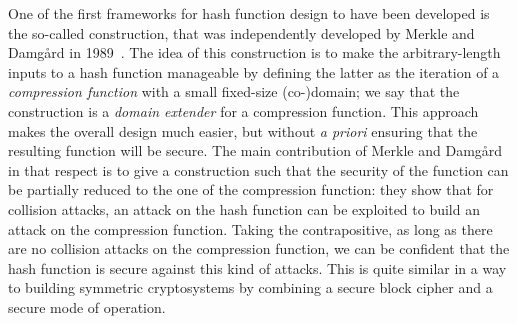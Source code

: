 One of the first frameworks for hash function design to have been developed is the so-called \merkdam construction, that was independently developed by
Merkle and Damg\aa rd in 1989~\cite{DBLP:conf/crypto/Merkle89a,DBLP:conf/crypto/Damgard89a}. The idea of this construction is to make the arbitrary-length
inputs to a hash function manageable by defining the latter as the iteration of a \emph{compression function} with a small fixed-size (co-)domain; we say
that the construction is a \emph{domain extender} for a compression function.
This approach makes the overall design much easier, but without \emph{a priori} ensuring that the resulting function will be secure. The main contribution of
Merkle and Damg\aa rd in that respect is to give a construction such that the security of the function can be partially reduced to the one of
the compression function: they show that for \eg collision attacks, an attack on the hash function can be exploited to build an attack on the compression function.
Taking the contrapositive, as long as there are no collision attacks on the compression function, we can be confident that the hash function is secure against this kind of attacks.
This is quite similar in a way to building symmetric cryptosystems by combining a secure block cipher and a secure mode of operation.

